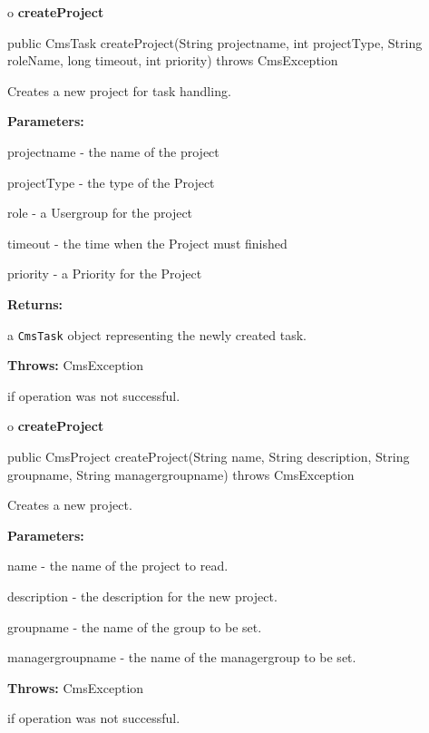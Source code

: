 o {\bf createProject}

\begin{PRE}
 public CmsTask createProject(String projectname,
                              int projectType,
                              String roleName,
                              long timeout,
                              int priority) throws CmsException
\end{PRE}

\begin{description}
\htmlDD Creates a new project for task handling.

\begin{description}
\item {\bf Parameters:}

projectname - the name of the project

projectType - the type of the Project

role - a Usergroup for the project

timeout - the time when the Project must finished

priority - a Priority for the Project
\item {\bf Returns:}

a {\tt CmsTask} object representing the newly created task.
\item {\bf Throws:} CmsException

if operation was not successful.
\end{description}

\end{description}

o {\bf createProject}

\begin{PRE}
 public CmsProject createProject(String name,
                                 String description,
                                 String groupname,
                                 String managergroupname) throws CmsException
\end{PRE}

\begin{description}
\htmlDD Creates a new project.

\begin{description}
\item {\bf Parameters:}

name - the name of the project to read.

description - the description for the new project.

groupname - the name of the group to be set.

managergroupname - the name of the managergroup to be set.
\item {\bf Throws:} CmsException

if operation was not successful.
\end{description}

\end{description}

